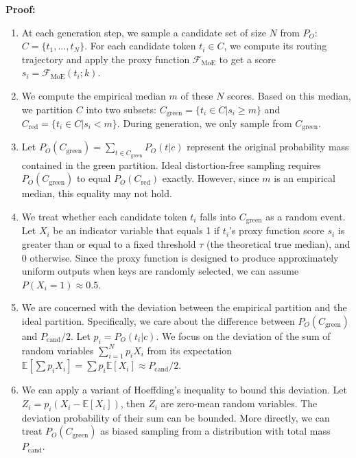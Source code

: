 \documentclass[letterpaper,twocolumn,10pt]{article}
\begin{document}
\textbf{Proof:}

\begin{enumerate}
\item At each generation step, we sample a candidate set of size $N$ from $P_O$: $C = \{t_1,..., t_N\}$. For each candidate token $t_i \in C$, we compute its routing trajectory and apply the proxy function $\mathcal{F}_{\text{MoE}}$ to get a score $s_i = \mathcal{F}_{\text{MoE}}(t_i; k)$.

\item We compute the empirical median $m$ of these $N$ scores. Based on this median, we partition $C$ into two subsets: $C_{\text{green}} = \{t_i \in C | s_i \ge m\}$ and $C_{\text{red}} = \{t_i \in C | s_i < m\}$. During generation, we only sample from $C_{\text{green}}$.

\item Let $P_O(C_{\text{green}}) = \sum_{t \in C_{\text{green}}} P_O(t|c)$ represent the original probability mass contained in the green partition. Ideal distortion-free sampling requires $P_O(C_{\text{green}})$ to equal $P_O(C_{\text{red}})$ exactly. However, since $m$ is an empirical median, this equality may not hold.

\item We treat whether each candidate token $t_i$ falls into $C_{\text{green}}$ as a random event. Let $X_i$ be an indicator variable that equals 1 if $t_i$'s proxy function score $s_i$ is greater than or equal to a fixed threshold $\tau$ (the theoretical true median), and 0 otherwise. Since the proxy function is designed to produce approximately uniform outputs when keys are randomly selected, we can assume $P(X_i=1) \approx 0.5$.

\item We are concerned with the deviation between the empirical partition and the ideal partition. Specifically, we care about the difference between $P_O(C_{\text{green}})$ and $P_{\text{cand}}/2$. Let $p_i = P_O(t_i|c)$. We focus on the deviation of the sum of random variables $\sum_{i=1}^N p_i X_i$ from its expectation $\mathbb{E}[\sum p_i X_i] = \sum p_i \mathbb{E}[X_i] \approx P_{\text{cand}}/2$.

\item We can apply a variant of Hoeffding's inequality to bound this deviation. Let $Z_i = p_i(X_i - \mathbb{E}[X_i])$, then $Z_i$ are zero-mean random variables. The deviation probability of their sum can be bounded. More directly, we can treat $P_O(C_{\text{green}})$ as biased sampling from a distribution with total mass $P_{\text{cand}}$.


\end{enumerate}
\end{document}
